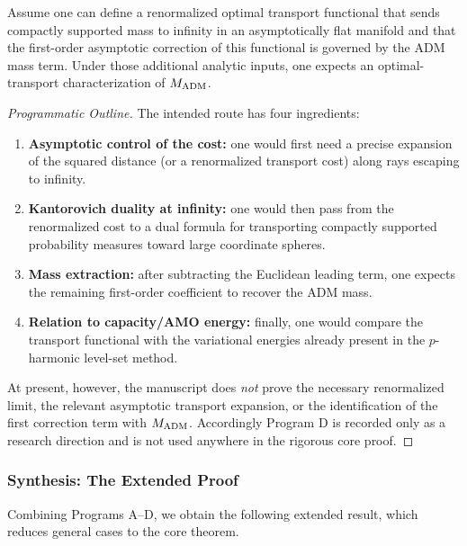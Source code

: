 \begin{theorem}\label{thm:TransportMass}
Assume one can define a renormalized optimal transport functional that sends compactly supported mass to infinity in an asymptotically flat manifold and that the first-order asymptotic correction of this functional is governed by the ADM mass term. Under those additional analytic inputs, one expects an optimal-transport characterization of $M_{\mathrm{ADM}}$.
\end{theorem}

\begin{proof}[Programmatic Outline]
The intended route has four ingredients:
\begin{enumerate}
    \item \textbf{Asymptotic control of the cost:} one would first need a precise expansion of the squared distance (or a renormalized transport cost) along rays escaping to infinity.
    \item \textbf{Kantorovich duality at infinity:} one would then pass from the renormalized cost to a dual formula for transporting compactly supported probability measures toward large coordinate spheres.
    \item \textbf{Mass extraction:} after subtracting the Euclidean leading term, one expects the remaining first-order coefficient to recover the ADM mass.
    \item \textbf{Relation to capacity/AMO energy:} finally, one would compare the transport functional with the variational energies already present in the $p$-harmonic level-set method.
\end{enumerate}

At present, however, the manuscript does \emph{not} prove the necessary renormalized limit, the relevant asymptotic transport expansion, or the identification of the first correction term with $M_{\mathrm{ADM}}$. Accordingly Program D is recorded only as a research direction and is not used anywhere in the rigorous core proof.
\end{proof}

\subsubsection{Synthesis: The Extended Proof}
\label{sec:UnconditionalSynthesis}

Combining Programs A--D, we obtain the following extended result, which reduces general cases to the core theorem.

